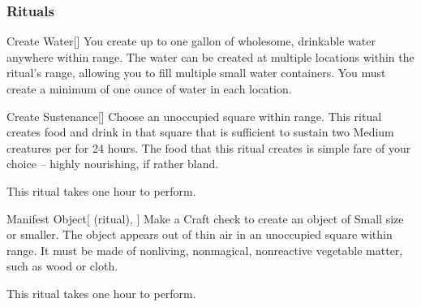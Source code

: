 \subsubsection{Rituals}


\lowercase{\hypertarget{spell:Create Water}{}}\label{spell:Create Water}
\begin{ability}[\nth{1}]{\hypertarget{spell:Create Water}{Create Water}}[]
You create up to one gallon of wholesome, drinkable water anywhere within \rngclose range.
The water can be created at multiple locations within the ritual's range, allowing you to fill multiple small water containers.
You must create a minimum of one ounce of water in each location.
\end{ability}
\vspace{0.25em}



\lowercase{\hypertarget{spell:Create Sustenance}{}}\label{spell:Create Sustenance}
\begin{ability}[\nth{2}]{\hypertarget{spell:Create Sustenance}{Create Sustenance}}[]
Choose an unoccupied square within \rngclose range.
This ritual creates food and drink in that square that is sufficient to sustain two Medium creatures per  for 24 hours.
The food that this ritual creates is simple fare of your choice -- highly nourishing, if rather bland.

This ritual takes one hour to perform.
\end{ability}
\vspace{0.25em}



\lowercase{\hypertarget{spell:Manifest Object}{}}\label{spell:Manifest Object}
\begin{ability}[\nth{2}]{\hypertarget{spell:Manifest Object}{Manifest Object}}[ (ritual), ]
Make a Craft check to create an object of Small size or smaller.
The object appears out of thin air in an unoccupied square within \rngclose range.
It must be made of nonliving, nonmagical, nonreactive vegetable matter, such as wood or cloth.

This ritual takes one hour to perform.
\end{ability}
\vspace{0.25em}



